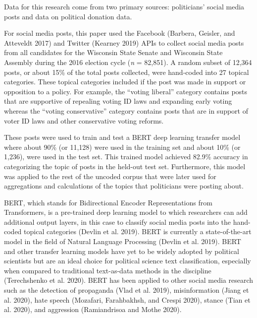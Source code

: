 \documentclass[12pt,]{article}
\begin{document}
Data for this research come from two primary sources: politicians'
social media posts and data on political donation data.

For social media posts, this paper used the Facebook (Barbera, Geisler,
and Atteveldt 2017) and Twitter (Kearney 2019) APIs to collect social
media posts from all candidates for the Wisconsin State Senate and
Wisconsin State Assembly during the 2016 election cycle (\emph{n} =
82,851). A random subset of 12,364 posts, or about 15\% of the total
posts collected, were hand-coded into 27 topical categories. These
topical categories included if the post was made in support or
opposition to a policy. For example, the ``voting liberal'' category
contains posts that are supportive of repealing voting ID laws and
expanding early voting whereas the ``voting conservative'' category
contains posts that are in support of voter ID laws and other
conservative voting reforms.

These posts were used to train and test a BERT deep learning transfer
model where about 90\% (or 11,128) were used in the training set and
about 10\% (or 1,236), were used in the test set. This trained model
achieved 82.9\% accuracy in categorizing the topic of posts in the
held-out test set. Furthermore, this model was applied to the rest of
the uncoded corpus that were later used for aggregations and
calculations of the topics that politicians were posting about.

BERT, which stands for Bidirectional Encoder Representations from
Transformers, is a pre-trained deep learning model to which researchers
can add additional output layers, in this case to classify social media
posts into the hand-coded topical categories (Devlin et al. 2019). BERT
is currently a state-of-the-art model in the field of Natural Language
Processing (Devlin et al. 2019). BERT and other transfer learning models
have yet to be widely adopted by political scientists but are an ideal
choice for political science text classification, especially when
compared to traditional text-as-data methods in the discipline
(Terechshenko et al. 2020). BERT has been applied to other social media
research such as the detection of propaganda (Vlad et al. 2019),
misinformation (Jiang et al. 2020), hate speech (Mozafari, Farahbakhsh,
and Crespi 2020), stance (Tian et al. 2020), and aggression
(Ramiandrisoa and Mothe 2020).
\end{document}
